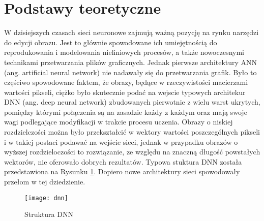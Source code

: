 \section{Podstawy teoretyczne}

  W dzisiejszych czasach sieci neuronowe zajmują ważną pozycję na rynku narzędzi
  do edycji obrazu. Jest to głównie spowodowane ich umiejętnością do
  reprodukowania i modelowania nieliniowych procesów, a także nowoczesnymi
  technikami przetwarzania plików graficznych.
  Jednak pierwsze architektury ANN (ang. artificial neural network) nie nadawały
  się do przetwarzania grafik.
  Było to częściwo spowodowane faktem, że obrazy, będące w rzeczywistości macierzami
  wartości pikseli,
  ciężko było skutecznie podać
  na wejscie typowych architekur DNN (ang. deep neural network) zbudowanych
  pierwotnie z wielu warst ukrytych, pomiędzy którymi połączenia są na zasadzie
  każdy z każdym oraz mają swoje wagi podlegające modyfikacji w trakcie procesu
  uczenia.
  Obrazy o niskiej rozdzielczości można było przekształcić w wektory
  wartości poszczególnych pikseli i w takiej postaci podawać na wejście sieci,
  jednak w przypadku obrazów o wyższej rozdzieloczości to rozwiązanie, ze
  względu na znaczną długość powstałych wektorów, nie oferowało dobrych
  rezultatów.
  Typowa stuktura DNN została przedstawiona na Rysunku \ref{fig:dnn}.
  Dopiero nowe architektury sieci spowodowały przełom w tej dziedzienie.

  \begin{figure}[h]
    \centering
    \texttt{[image: dnn]}
    \caption{Struktura DNN}
    \label{fig:dnn}
  \end{figure}


